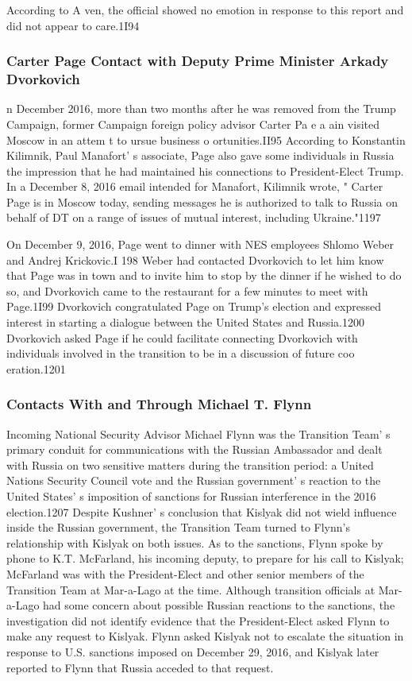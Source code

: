 According to A ven, the official showed no emotion in response to this report and did not appear to care.1I94

\subsubsection{Carter Page Contact with Deputy Prime Minister Arkady Dvorkovich}

n December 2016, more than two months after he was removed from the Trump Campaign, former Campaign foreign policy advisor Carter Pa e  a ain visited Moscow in an attem t  to ursue business o ortunities.II95 According to Konstantin Kilimnik, Paul Manafort' s associate, Page also gave some individuals in Russia the impression that he had maintained his connections to President-Elect Trump. In a  December 8, 2016 email intended for Manafort, Kilimnik wrote, " Carter Page is in Moscow today, sending messages he is authorized to talk to Russia on behalf of DT on a range of issues of mutual interest, including Ukraine."1197

On December 9, 2016,  Page went to dinner with NES employees Shlomo Weber and Andrej Krickovic.I 198 Weber had contacted Dvorkovich to let him know that Page was in town and to invite him to stop by the dinner if he wished to do so, and Dvorkovich came to the restaurant for a few minutes to meet with Page.1I99 Dvorkovich congratulated Page on Trump's election and expressed interest in starting a  dialogue between the United States and Russia.1200 Dvorkovich asked Page if he could facilitate connecting Dvorkovich with individuals involved in the transition to be in a  discussion of future coo eration.1201

\subsubsection{Contacts With and Through Michael T. Flynn}

Incoming National Security Advisor Michael Flynn was the Transition Team' s  primary conduit for communications with the Russian Ambassador and dealt with Russia on two sensitive matters during the transition period: a  United Nations Security Council vote and the Russian government' s  reaction to the United States' s  imposition of sanctions for Russian interference in the 2016 election.1207 Despite Kushner' s conclusion that Kislyak did not wield influence inside the Russian government, the Transition Team turned  to Flynn's relationship with Kislyak on both issues. As to the sanctions, Flynn spoke by phone to K.T. McFarland, his incoming deputy, to prepare for his call to Kislyak; McFarland was with the President-Elect and other senior members of the Transition Team at Mar-a-Lago at the time. Although transition officials at Mar-a-Lago had some concern about possible Russian reactions to the sanctions, the investigation did not identify evidence that the President-Elect asked Flynn to make any request to Kislyak. Flynn asked Kislyak not to escalate the situation in response to U.S. sanctions imposed on December 29, 2016, and Kislyak later reported to Flynn that Russia acceded to that request.

